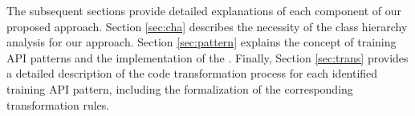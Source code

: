 
The subsequent sections provide detailed explanations of each component of our
proposed approach. 
Section \ref{sec:cha} describes the necessity of the class hierarchy analysis
for our approach.
Section \ref{sec:pattern} explains the concept of training API patterns and the
implementation of the \tapi.
Finally, Section \ref{sec:trans} provides a detailed description of the code
transformation process for each identified training API pattern, including the
formalization of the corresponding transformation rules.
